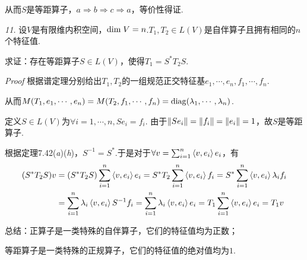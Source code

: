 从而\(S\)是等距算子，\(a \Rightarrow b \Rightarrow c \Rightarrow a\)，等价性得证.

\hspace*{\fill}

\textit{11.}
设\(V\)是有限维内积空间，\(\mathrm{dim \;} V=n\).\(T_1,T_2 \in L(V)\)是自伴算子且拥有相同的\(n\)个特征值.

求证：存在等距算子\(S \in L(V)\)，使得\(T_1=S^*T_2S\).

\textit{Proof}
根据谱定理分别给出\(T_1,T_2\)的一组规范正交特征基\(e_1,\cdots,e_n,f_1,\cdots,f_n\).

从而\(M(T_1,e_1,\cdots,e_n)=M(T_2,f_1,\cdots,f_n)=\mathrm{diag}(\lambda_1,\cdots,\lambda_n)\).

定义\(S \in L(V)\)为\(\forall i=1,\cdots,n,Se_i=f_i\).
由于\(\left\lVert Se_i \right\rVert=\left\lVert f_i \right\rVert=\left\lVert e_i \right\rVert=1\)，故\(S\)是等距算子.

根据定理7.42(\textit{a})(\textit{h})，\(S^{-1}=S^*\).于是对于\(\forall v=\sum_{i=1}^n \left\langle v,e_i \right\rangle e_i\)，有
    \begin{align*}
        (S^*T_2S)v&=(S^*T_2S)\sum_{i=1}^n \left\langle v,e_i \right\rangle e_i=S^*T_2\sum_{i=1}^n \left\langle v,e_i \right\rangle f_i
        =S^*\sum_{i=1}^n \left\langle v,e_i \right\rangle\lambda_if_i \\
        &=\sum_{i=1}^n \lambda_i\left\langle v,e_i \right\rangle S^{-1}f_i
        =\sum_{i=1}^n \lambda_i\left\langle v,e_i \right\rangle e_i=T_1\sum_{i=1}^n \left\langle v,e_i \right\rangle e_i=T_1v
    \end{align*}

\hspace*{\fill}

总结：正算子是一类特殊的自伴算子，它们的特征值均为正数；

等距算子是一类特殊的正规算子，它们的特征值的绝对值均为\(1\).

